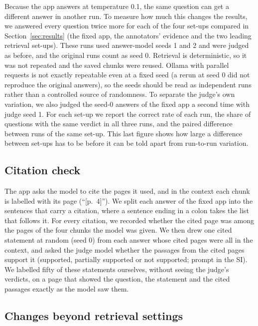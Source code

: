 Because the app answers at temperature 0.1, the same question can get a different answer in
another run. To measure how much this changes the results, we answered every question twice more
for each of the four set-ups compared in Section~\ref{sec:results} (the fixed app, the
annotators' evidence and the two leading retrieval set-ups). These runs used answer-model seeds 1
and 2 and were judged as before, and the original runs count as seed 0. Retrieval is
deterministic, so it was not repeated and the saved chunks were reused. Ollama with parallel
requests is not exactly repeatable even at a fixed seed (a rerun at seed 0 did not reproduce the
original answers), so the seeds should be read as independent runs rather than a controlled
source of randomness. To separate the judge's own variation, we also judged the seed-0 answers of
the fixed app a second time with judge seed 1. For each set-up we report the correct rate of each
run, the share of questions with the same verdict in all three runs, and the paired difference
between runs of the same set-up. This last figure shows how large a difference between set-ups
has to be before it can be told apart from run-to-run variation.

\subsection{Citation check}
\label{sec:eval-citations}

The app asks the model to cite the pages it used, and in the context each chunk is labelled with
its page (``[p.~4]''). We split each answer of the fixed app into the sentences that carry a
citation, where a sentence ending in a colon takes the list that follows it. For every citation,
we recorded whether the cited page was among the pages of the four chunks the model was given.
We then drew one cited statement at random (seed 0) from each answer whose cited pages were all
in the context, and asked the judge model whether the passages from the cited pages support it
(supported, partially supported or not supported; prompt in the SI). We labelled fifty of these
statements ourselves, without seeing the judge's verdicts, on a page that showed the question,
the statement and the cited passages exactly as the model saw them.

\subsection{Changes beyond retrieval settings}
\label{sec:eval-changes}

